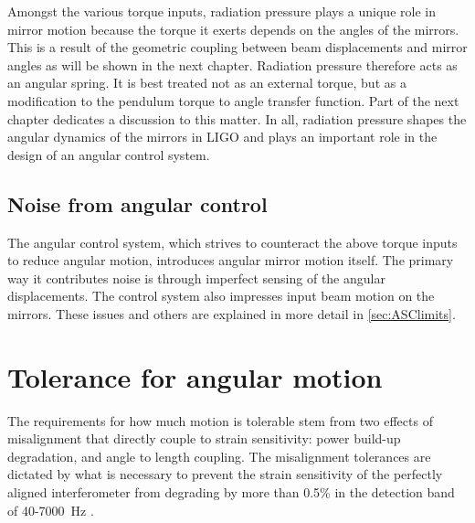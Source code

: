 Amongst the various torque inputs, radiation pressure plays a unique role in mirror motion because the torque it exerts depends on the angles of the mirrors. This is a result of the geometric coupling between beam displacements and mirror angles as will be shown in the next chapter. Radiation pressure therefore acts as an angular spring. It is best treated not as an external torque, but as a modification to the pendulum torque to angle transfer function. Part of the next chapter dedicates a discussion to this matter. In all, radiation pressure shapes the angular dynamics of the mirrors in LIGO and plays an important role in the design of an angular control system.



\subsection{Noise from angular control}
The angular control system, which strives to counteract the above torque inputs to reduce angular motion, introduces angular mirror motion itself. The primary way it contributes noise is through imperfect sensing of the angular displacements. The control system also impresses input beam motion on the mirrors. These issues and others are explained in more detail in \ref{sec:ASClimits}.



\section{Tolerance for angular motion}

The requirements for how much motion is tolerable stem from two effects of misalignment that directly couple to strain sensitivity: power build-up degradation, and angle to length coupling. The misalignment tolerances are dictated by what is necessary to prevent the strain sensitivity of the perfectly aligned interferometer from degrading by more than 0.5\% in the detection band of 40-7000~Hz \cite{Fritschel1997Alignment}.

